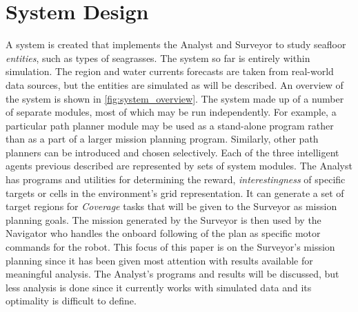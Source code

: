 \documentclass{tamuccthesis}
\begin{document}
\chapter{System Design}

A system is created that implements the Analyst and Surveyor to study seafloor \textit{entities}, such as types of seagrasses. The system so far is entirely within simulation. The region and water currents forecasts are taken from real-world data sources, but the entities are simulated as will be described. An overview of the system is shown in \ref{fig:system_overview}. The system made up of a number of separate modules, most of which may be run independently. For example, a particular path planner module may be used as a stand-alone program rather than as a part of a larger mission planning program. Similarly, other path planners can be introduced and chosen selectively. Each of the three intelligent agents previous described are represented by sets of system modules. The Analyst has programs and utilities for determining the reward, \textit{interestingness} of specific targets or cells in the environment's grid representation. It can generate a set of target regions for \textit{Coverage} tasks that will be given to the Surveyor as mission planning goals. The mission generated by the Surveyor is then used by the Navigator who handles the onboard following of the plan as specific motor commands for the robot. This focus of this paper is on the Surveyor's mission planning since it has been given most attention with results available for meaningful analysis. The Analyst's programs and results will be discussed, but less analysis is done since it currently works with simulated data and its optimality is difficult to define.
\end{document}
